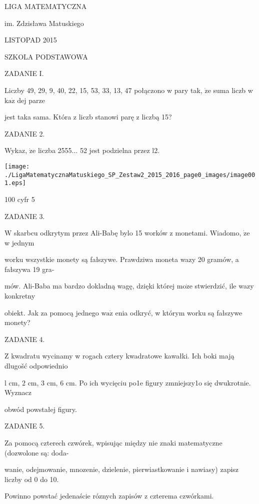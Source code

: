 \documentclass[a4paper,12pt]{article}
\begin{document}
LIGA MATEMATYCZNA

im. Zdzisława Matuskiego

LISTOPAD 2015

SZKOLA PODSTAWOWA

ZADANIE I.

Liczby 49, 29, 9, 40, 22, 15, 53, 33, 13, 47 połączono w pary tak, $\dot{\mathrm{z}}\mathrm{e}$ suma liczb w $\mathrm{k}\mathrm{a}\dot{\mathrm{z}}$ dej parze

jest taka sama. Która z liczb stanowi parę z liczbą 15?

ZADANIE 2.

Wykaz, $\dot{\mathrm{z}}\mathrm{e}$ liczba 2555$\ldots$ 52 jest podzielna przez l2.
\begin{center}
\texttt{[image: ./LigaMatematycznaMatuskiego\_SP\_Zestaw2\_2015\_2016\_page0\_images/image001.eps]}
\end{center}
100 cyfr 5

ZADANIE 3.

$\mathrm{W}$ skarbcu odkrytym przez Ali-Babę bylo 15 worków z monetami. Wiadomo, $\dot{\mathrm{z}}\mathrm{e}$ w jednym

worku wszystkie monety są fałszywe. Prawdziwa moneta wazy 20 gramów, a fałszywa 19 gra-

mów. Ali-Baba ma bardzo dokladną wagę, dzięki której $\mathrm{m}\mathrm{o}\dot{\mathrm{z}}\mathrm{e}$ stwierdzić, ile wazy konkretny

obiekt. Jak za pomocą jednego $\mathrm{w}\mathrm{a}\dot{\mathrm{z}}$ enia odkryć, w którym worku są fałszywe monety?

ZADANIE 4.

$\mathrm{Z}$ kwadratu wycinamy w rogach cztery kwadratowe kawałki. Ich boki mają dlugošć odpowiednio

l cm, 2 cm, 3 cm, 6 cm. Po ich wycięciu po1e figury zmniejszy1o się dwukrotnie. Wyznacz

obwód powstałej figury.

ZADANIE 5.

Za pomocą czterech czwórek, wpisując między nie znaki matematyczne (dozwolone są: doda-

wanie, odejmowanie, mnozenie, dzielenie, pierwiastkowanie i nawiasy) zapisz liczby od 0 do 10.

Powinno powstać jedenaście róznych zapisów z czterema czwórkami.
\end{document}
